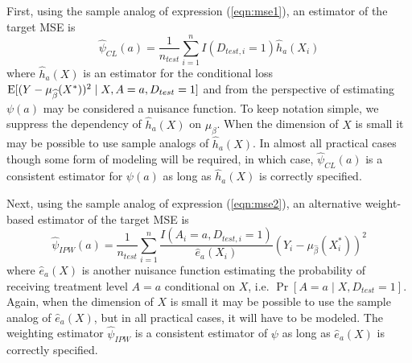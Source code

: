 First, using the sample analog of expression (\ref{eqn:mse1}), an estimator of the target MSE is 
\begin{equation}\label{eqn:cl_estimator}
    \widehat{\psi}_{CL}(a) = \frac{1}{n_{test}} \sum_{i=1}^nI(D_{test, i} = 1)\widehat{h}_a(X_i)
\end{equation}
where $\widehat{h}_a(X)$ is an estimator for the conditional loss $\operatorname{E}[(Y - \mu_{\widehat{\beta}}(X^*))^2 \mid X, A=a, D_{test} = 1]$ and from the perspective of estimating $\psi(a)$ may be considered a nuisance function. To keep notation simple, we suppress the dependency of $\widehat{h}_a(X)$ on $\mu_{\widehat{\beta}}$. When the dimension of $X$ is small it may be possible to use sample analogs of $\widehat{h}_a(X)$. In almost all practical cases though some form of modeling will be required, in which case, $\widehat{\psi}_{CL}(a)$ is a consistent estimator for $\psi(a)$ as long as $\widehat{h}_a(X)$ is correctly specified.

Next, using the sample analog of expression (\ref{eqn:mse2}), an alternative weight-based estimator of the target MSE is 
\begin{equation}\label{eqn:ipw_estimator}
    \widehat{\psi}_{IPW}(a) = \frac{1}{n_{test}} \sum_{i=1}^n \frac{I(A_i = a, D_{test, i} = 1)}{\widehat{e}_a(X_i)}(Y_i - \mu_{\widehat{\beta}}(X^*_i))^2
\end{equation}
where $\widehat{e}_a(X)$ is another nuisance function estimating the probability of receiving treatment level $A = a$ conditional on $X$, i.e. $\Pr[A = a \mid X, D_{test} = 1]$. Again, when the dimension of $X$ is small it may be possible to use the sample analog of $\widehat{e}_a(X)$, but in all practical cases, it will have to be modeled. The weighting estimator $\widehat{\psi}_{IPW}$ is a consistent estimator of $\psi$ as long as $\widehat{e}_a(X)$ is correctly specified.


